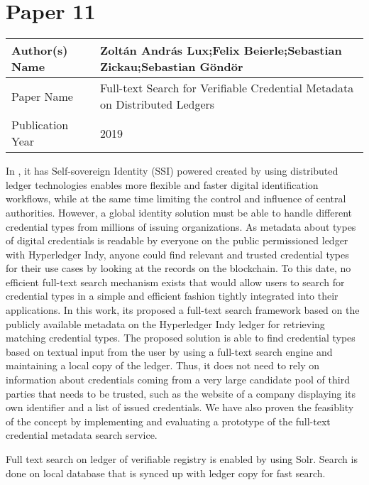 \section{Paper 11}
    \begin{center}
    \begin{tabular}{ | m{5em} | m{25em} |} 
      \hline
      Author(s) Name &  Zoltán András Lux;Felix Beierle;Sebastian Zickau;Sebastian Göndör\\ 
      \hline
      Paper Name &  Full-text Search for Verifiable Credential Metadata on Distributed Ledgers\\ 
      \hline
      Publication Year & 2019\\ 
      \hline
    \end{tabular}
    \end{center}
    In \cite{8939249}, it has Self-sovereign Identity (SSI) powered created by using distributed ledger technologies enables more flexible and faster digital identification workflows, while at the same time limiting the control and influence of central authorities. However, a global identity solution must be able to handle different credential types from millions of issuing organizations. As metadata about types of digital credentials is readable by everyone on the public permissioned ledger with Hyperledger Indy, anyone could find relevant and trusted credential types for their use cases by looking at the records on the blockchain. To this date, no efficient full-text search mechanism exists that would allow users to search for credential types in a simple and efficient fashion tightly integrated into their applications. In this work, its proposed a full-text search framework based on the publicly available metadata on the Hyperledger Indy ledger for retrieving matching credential types. The proposed solution is able to find credential types based on textual input from the user by using a full-text search engine and maintaining a local copy of the ledger. Thus, it does not need to rely on information about credentials coming from a very large candidate pool of third parties that needs to be trusted, such as the website of a company displaying its own identifier and a list of issued credentials. We have also proven the feasiblity of the concept by implementing and evaluating a prototype of the full-text credential metadata search service. 
    \par Full text search on ledger of verifiable registry is enabled by using Solr. Search is done on local database that is synced up with ledger copy for fast search.